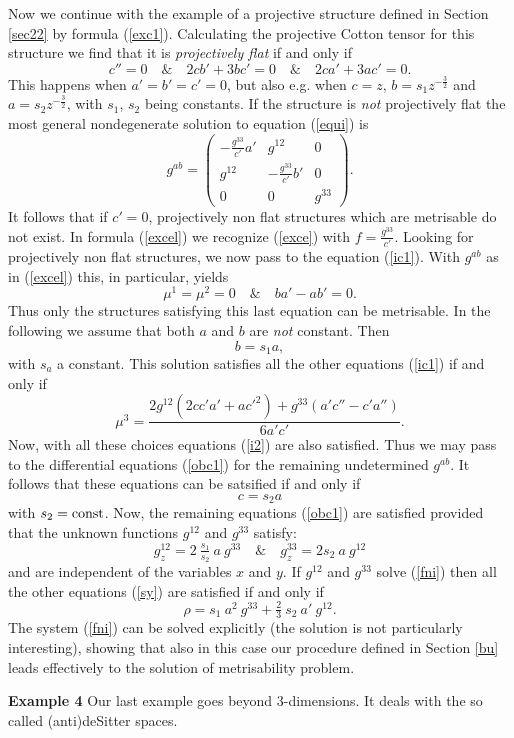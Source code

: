 \documentclass[letterpaper]{amsart}
\theoremstyle{definition}
\theoremstyle{remark}
\newcommand{\be}{\begin{equation}}
\newcommand{\ee}{\end{equation}}
\newcommand{\g}{\gamma}
\newcommand{\bma}{\begin{pmatrix}}
\newcommand{\ema}{\end{pmatrix}}
\begin{document}
Now we continue with the example of a projective
structure defined in Section \ref{sec22} by formula
(\ref{exc1}). Calculating the projective Cotton tensor for this
structure we find that it is \emph{projectively flat} if and only if 
$$c''=0\quad\&\quad 2cb'+3bc'=0\quad\&\quad 2ca'+3ac'=0.$$
This happens when $a'=b'=c'=0$, but also e.g. 
when $c=z$, $b=s_1 z^{-\tfrac32}$ and $a=s_2
z^{-\tfrac32}$, with $s_1$, $s_2$ being constants. If the structure is
\emph{not} projectively flat the most general 
nondegenerate solution to equation (\ref{equi}) is
\be
g^{ab}=\bma-\frac{g^{33}}{c'} a'&g^{12}&0\\g^{12}&-\frac{g^{33}}{c'} b'&0\\0&0&g^{33}
\ema.\label{excel}\ee
It follows that if $c'=0$, projectively non flat structures which are metrisable do not
exist. In formula (\ref{excel}) we recognize (\ref{exce}) with
$f=\frac{g^{33}}{c'} $.  Looking for projectively non flat structures,
we now pass to the equation (\ref{ic1}). With $g^{ab}$ as in
(\ref{excel}) this, in particular, yields 
$$\mu^1=\mu^2=0\quad\&\quad ba'-ab'=0.$$
Thus only the structures satisfying this last equation can be
metrisable. In the following we assume that both $a$ and $b$ are
\emph{not} constant. Then $$b=s_1 a,$$ with $s_a$ a constant. 
This solution satisfies all the other equations (\ref{ic1}) if and only if 
$$\mu^3=\frac{2g^{12}(2cc'a'+a{c'}^2)+g^{33}(a'c''-c'a'')}{6a'c'}.$$
Now, with all these choices equations (\ref{i2}) are also
satisfied. Thus we may pass to the differential equations (\ref{obc1}) for the
remaining undetermined $g^{ab}$. It follows that these equations can be
satsified if and only if $$c=s_2 a$$ with $s_2={\rm const}$. Now, the
remaining equations (\ref{obc1}) are satisfied provided that the
unknown functions $g^{12}$ and $g^{33}$ satisfy:
\be
g^{12}_z=2~\tfrac{s_1}{s_2}~a~g^{33}\quad\&\quad g^{33}_z=2s_2 ~a~g^{12}\label{fni}\ee
and are independent of the variables $x$ and $y$. If $g^{12}$ and
$g^{33}$ solve (\ref{fni}) then 
all the other equations (\ref{sy}) are satisfied if and only if 
$$\rho=s_1~a^2~g^{33}+\tfrac23 ~s_2 ~a' ~g^{12}.$$
The system (\ref{fni}) can be solved explicitly (the solution is not
particularly interesting), showing that also in this
case our procedure defined in Section \ref{bu} leads effectively to
the solution of metrisability problem.



\vspace{0.3truecm}
{\bf Example 4} Our last example goes beyond 3-dimensions. It deals
with the so called (anti)deSitter spaces. 
\end{document}
